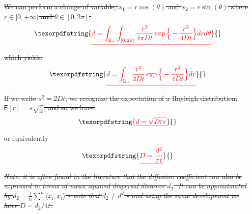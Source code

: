 \documentclass[]{bmcart}
\providecommand{\DIFdeltex}[1]{{\protect\color{red}\sout{#1}}}                      %
\providecommand{\DIFdelend}{} %
\providecommand{\DIFdel}[1]{\texorpdfstring{\DIFdeltex{#1}}{}} %
\DeclareRobustCommand{\DIFdelend}{\DIFOaddend \let\includegraphics\DIFOincludegraphics} %
\begin{document}
\begin{backmatter}
\DIFdel{We can perform a change of variable, $x_1 = r \cos(\theta)$ and $x_2 = r \sin(\theta)$ where $r \in [0, +\infty)$ and $\theta \in [0, 2 \pi]$:
}\begin{displaymath} \DIFdel{d = \int_{\mathbb{R_+}} \int_{[0, 2 \pi]} \frac{r^2}{4 \pi D t} \exp\Big\{-\frac{r^2}{4 D t}\Big\} dr d\theta }\end{displaymath}%
\DIFdel{which yields:
}\begin{displaymath} \DIFdel{d = \int_{\mathbb{R_+}} \frac{r^2}{2 D t} \exp\Big\{-\frac{r^2}{4 D t}\Big\} dr }\end{displaymath}%
\DIFdel{If we write $s^2 = 2 D t$, we recognize the expectation of a Rayleigh distribution, $\mathsf{E}[r] = s \sqrt{\frac{\pi}{2}}$, and so we have:
}\begin{displaymath} \DIFdel{d = \sqrt{D t \pi } }\end{displaymath}%
\DIFdel{or equivalently
}\begin{displaymath}\DIFdel{D = \frac{d^2}{\pi t}}\end{displaymath}%
\emph{\DIFdel{Note: it is often found in the literature that the diffusion coefficient can also be expressed in terms of mean squared dispersal distance $d_2$. It can be approximated by $d_2 = \frac{1}{n}\sum^n  \langle x_i, x_i  \rangle$  - note that $d_2 \neq d^2$ - and using the same development we have $D = d_2/4 t$.}}
\DIFdelend \end{backmatter}
\end{document}
